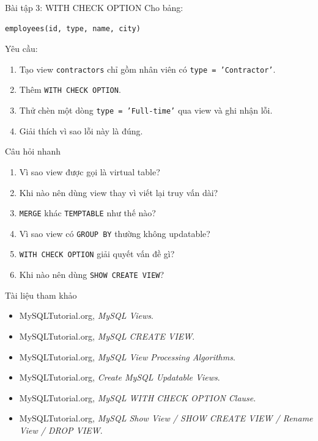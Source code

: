 \documentclass[aspectratio=169,11pt]{beamer}
\begin{document}
\begin{frame}[fragile]{Bài tập 3: WITH CHECK OPTION}
Cho bảng:
\begin{lstlisting}
employees(id, type, name, city)
\end{lstlisting}

Yêu cầu:
\begin{enumerate}
    \item Tạo view \texttt{contractors} chỉ gồm nhân viên có \texttt{type = 'Contractor'}.
    \item Thêm \texttt{WITH CHECK OPTION}.
    \item Thử chèn một dòng \texttt{type = 'Full-time'} qua view và ghi nhận lỗi.
    \item Giải thích vì sao lỗi này là đúng.
\end{enumerate}
\end{frame}

\begin{frame}{Câu hỏi nhanh}
\begin{enumerate}
    \item Vì sao view được gọi là virtual table?
    \item Khi nào nên dùng view thay vì viết lại truy vấn dài?
    \item \texttt{MERGE} khác \texttt{TEMPTABLE} như thế nào?
    \item Vì sao view có \texttt{GROUP BY} thường không updatable?
    \item \texttt{WITH CHECK OPTION} giải quyết vấn đề gì?
    \item Khi nào nên dùng \texttt{SHOW CREATE VIEW}?
\end{enumerate}
\end{frame}

\begin{frame}{Tài liệu tham khảo}
\small
\begin{itemize}
    \item MySQLTutorial.org, \textit{MySQL Views}.
    \item MySQLTutorial.org, \textit{MySQL CREATE VIEW}.
    \item MySQLTutorial.org, \textit{MySQL View Processing Algorithms}.
    \item MySQLTutorial.org, \textit{Create MySQL Updatable Views}.
    \item MySQLTutorial.org, \textit{MySQL WITH CHECK OPTION Clause}.
    \item MySQLTutorial.org, \textit{MySQL Show View / SHOW CREATE VIEW / Rename View / DROP VIEW}.
\end{itemize}
\end{frame}
\end{document}
